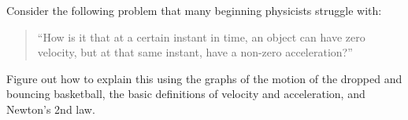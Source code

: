 \label{fnt8.2.1-7}

Consider the following problem that many beginning physicists struggle with:

\begin{quote}
``How is it that at a certain instant in time, an object can have zero velocity, but at that same instant, have a non-zero acceleration?'' 
\end{quote}

\noindent Figure out how to explain this using the graphs of the motion of the dropped and bouncing basketball, the basic definitions of velocity and acceleration, and Newton's 2nd law.

